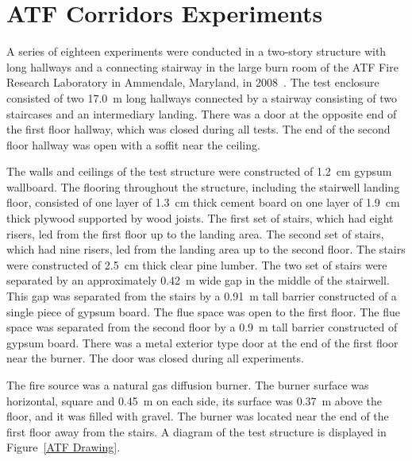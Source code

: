 \section{ATF Corridors Experiments}
\label{ATF_Corridors_Description}

A series of eighteen experiments were conducted in a two-story structure with long hallways and a connecting stairway in the large burn room of the ATF Fire Research Laboratory in Ammendale, Maryland, in 2008~\cite{Sheppard:Corridors}. The test enclosure consisted of two 17.0~m long hallways connected by a stairway consisting of two staircases and an intermediary landing. There was a door at the opposite end of the first floor hallway, which was closed during all tests. The end of the second floor hallway was open with a soffit near the ceiling.

The walls and ceilings of the test structure were constructed of 1.2~cm gypsum wallboard. The flooring throughout the structure, including the stairwell landing floor, consisted of one layer of 1.3~cm thick cement board on one layer of 1.9~cm thick plywood supported by wood joists. The first set of stairs, which had eight risers, led from the first floor up to the landing area. The second set of stairs, which had nine risers, led from the landing area up to the second floor. The stairs were constructed of 2.5~cm thick clear pine lumber. The two set of stairs were separated by an approximately 0.42~m wide gap in the middle of the stairwell. This gap was separated from the stairs by a 0.91~m tall barrier constructed of a single piece of gypsum board. The flue space was open to the first floor.  The flue space was separated from the second floor by a 0.9~m tall barrier constructed of gypsum board. There was a metal exterior type door at the end of the first floor near the burner.  The door was closed during all experiments.

The fire source was a natural gas diffusion burner.  The burner surface was horizontal, square and 0.45~m on each side, its surface was 0.37~m above the floor, and it was filled with gravel. The burner was located near the end of the first floor away from the stairs. A diagram of the test structure is displayed in Figure~\ref{ATF Drawing}.

